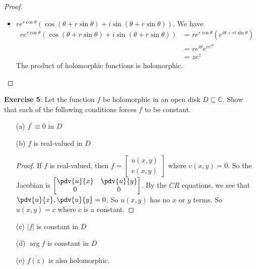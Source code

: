 \documentclass{article}
\begin{document}
\begin{proof}
\begin{itemize}
                \item $re^{r\cos{\theta}}(\cos{(\theta + r \sin{\theta}) + i\sin{(\theta + r \sin{\theta})}})$. We have
                    \begin{align*}
                        re^{r\cos{\theta}}(\cos{(\theta + r\sin{\theta}) + i\sin{(\theta + r\sin{\theta})}}) &= re^{r\cos{\theta}}(e^{i\theta + ri\sin{\theta}}) \\
                                                                                                             &= re^{i\theta}e^{re^{i\theta}}                     \\
                                                                                                             &= ze^{z}                                             
                    \end{align*}
                The product of holomorphic functions is holomorphic.
            \end{itemize}
    \end{proof}

\textbf{Exercise 5}: Let the function $f$ be holomorphic in an open disk $D \subseteq \mathbb{C}$. Show that each of the following conditions forces $f$ to be constant.
    \begin{itemize}
        \item [(a)] $f^{\prime} \equiv 0$ in $D$

        \item [(b)] $f$ is real-valued in $D$
            \begin{proof}
                If $f$ is real-valued, then $f = \begin{bmatrix}
                    u(x, y) \\
                    v(x, y)   
                \end{bmatrix}$ where $v(x, y) = 0$. So the Jacobian is $\begin{bmatrix}
                    \pdv{u}{x} & \pdv{u}{y} \\
                    0          & 0            
                \end{bmatrix}$. By the $CR$ equations, we see that $\pdv{u}{x}, \pdv{u}{y} = 0$. So $u(x, y)$ has no $x$ or $y$ terms. So $u(x, y) = c$ where $c$ is a constant.
            \end{proof}

        \item [(c)] $\lvert f \rvert$ is constant in $D$

        \item [(d)] $\mathop{arg}f$ is constant in $D$

        \item [(e)] $\overline{f(z)}$ is also holomorphic.
    \end{itemize}       
\end{document}
